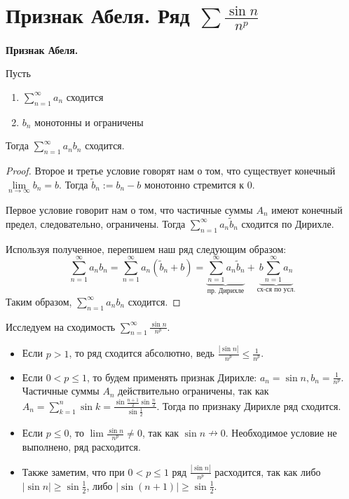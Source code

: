 \section{Признак Абеля. Ряд $\sum \frac{\sin n}{n^p}$}
\textbf{Признак Абеля.} 

Пусть \begin{enumerate}
    \item $\sum\limits_{n=1}^\infty a_n$ сходится
    \item $b_n$ монотонны и ограничены
\end{enumerate}
Тогда $\sum\limits_{n=1}^\infty a_nb_n$ сходится.
\begin{proof}
    Второе и третье условие говорят нам о том, что существует конечный $\lim\limits_{n \to \infty} b_n = b$.
    Тогда $\widetilde{b}_n := b_n - b$ монотонно стремится к 0.

    \quad Первое условие говорит нам о том, что частичные суммы $A_n$ имеют конечный предел, следовательно, ограничены.
    Тогда $\sum\limits_{n=1}^\infty a_n\widetilde{b}_n$ сходится по Дирихле.

    \quad Используя полученное, перепишем наш ряд следующим образом: \[ \sum_{n=1}^\infty a_nb_n = \sum_{n=1}^\infty a_n(\widetilde{b}_n + b) = \underbrace{\sum_{n=1}^\infty a_n\widetilde{b}_n}_{\text{пр. Дирихле}} + \underbrace{b\sum_{n=1}^\infty a_n}_{\text{сх-ся по усл.}} \]
    \quad Таким образом, $\sum\limits_{n=1}^\infty a_nb_n$ сходится.
\end{proof}

\vspace{4mm}

\begin{example}
    Исследуем на сходимость $\sum\limits_{n=1}^\infty \frac{\sin n}{n^p}$.
    \begin{itemize}
        \item Если $p > 1$, то ряд сходится абсолютно, ведь $\frac{|\sin n|}{n^p} \leqslant \frac{1}{n^p}$.
        \item Если $0 < p \leqslant 1$, то будем применять признак Дирихле: $a_n = \sin n, b_n = \frac{1}{n^p}$. 
        Частичные суммы $A_n$ действительно ограничены, так как $A_n = \sum\limits_{k=1}^n \sin k = \frac{\sin \frac{n+1}{2}\sin \frac{n}{2}}{\sin \frac{1}{2}}$. Тогда по признаку Дирихле ряд сходится.
        \item Если $p \leqslant 0$, то $\lim \frac{\sin n}{n^p} \neq 0$, так как $\sin n \nrightarrow 0$. Необходимое условие не выполнено, ряд расходится.
        \item Также заметим, что при $0 < p \leqslant 1$ ряд $\frac{|\sin n|}{n^p}$ расходится, так как либо $|\sin n| \geqslant \sin \frac{1}{2}$, либо $|\sin (n+1)| \geqslant \sin \frac{1}{2}$.
    \end{itemize}
\end{example}
